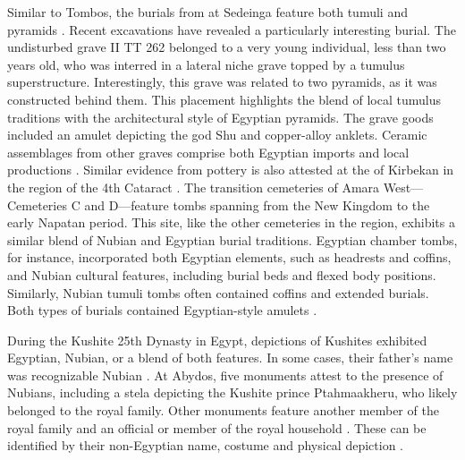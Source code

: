 Similar to Tombos, the burials from at Sedeinga feature both tumuli and pyramids \parencites{berger-elnaggarContributionSedeingaLhistoire2008}{rillyCloserAncestorsExcavations2018}. Recent excavations have revealed a particularly interesting burial. The undisturbed grave II TT 262 belonged to a very young individual, less than two years old, who was interred in a lateral niche grave topped by a tumulus superstructure. Interestingly, this grave was related to two pyramids, as it was constructed behind them. This placement highlights the blend of local tumulus traditions with the architectural style of Egyptian pyramids. The grave goods included an amulet depicting the god Shu and copper-alloy anklets. Ceramic assemblages from other graves comprise both Egyptian imports and local productions \parencites{rillySedeinga2012Season2013, rillyCloserAncestorsExcavations2018, rillyCollectiveGravesBastatues2020}. Similar evidence from pottery is also attested at the of Kirbekan in the region of the 4th Cataract \parencites{budkaDocumentationExcavationDome2007}. The transition cemeteries of Amara West---Cemeteries C and D---feature tombs spanning from the New Kingdom to the early Napatan period. This site, like the other cemeteries in the region, exhibits a similar blend of Nubian and Egyptian burial traditions. Egyptian chamber tombs, for instance, incorporated both Egyptian elements, such as headrests and coffins, and Nubian cultural features, including burial beds and flexed body positions. Similarly, Nubian tumuli tombs often contained coffins and extended burials. Both types of burials contained Egyptian-style amulets \parencites{spencerAmaraWestII2002}{binder10th9thCenturyBC2011}.


During the Kushite 25th Dynasty in Egypt, depictions of Kushites exhibited Egyptian, Nubian, or a blend of both features. In some cases, their father's name was recognizable Nubian \parencites{budkaKushiteTombGroups2010, budkaNubians1stMillennium2019, budkaNubiansEgypt25th2020}. At Abydos, five monuments attest to the presence of Nubians, including a stela depicting the Kushite prince Ptahmaakheru, who likely belonged to the royal family. Other monuments feature another member of the royal family and an official or member of the royal household \parencites{budkaKuschitenAbydosEinige2012}{leahyKushitesAbydosRoyal2014}. These can be identified by their non-Egyptian name, costume and physical depiction \parencite[p.~704-705]{budkaNubians1stMillennium2019}. 


